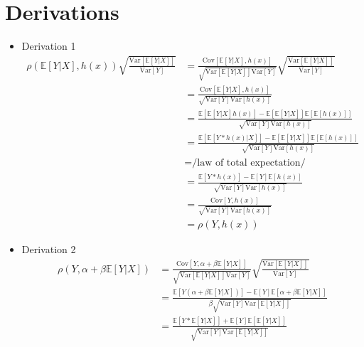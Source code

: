 \documentclass{article}
\begin{document}
\section*{Derivations}

\begin{itemize}
    \item Derivation 1
    \begin{align*}
        \rho(\mathbb{\text{E}}[Y|X], h(x))\sqrt{\frac{\text{Var}[\mathbb{\text{E}}[Y|X]]}{\text{Var}[Y]}} &= \frac{\text{Cov}[\mathbb{\text{E}}[Y|X], h(x)]}{\sqrt{\text{Var}[\mathbb{\text{E}}[Y|X]]\text{Var}[Y]}}\sqrt{\frac{\text{Var}[\mathbb{\text{E}}[Y|X]]}{\text{Var}[Y]}}\\
        &= \frac{\text{Cov}[\mathbb{\text{E}}[Y|X], h(x)]}{\sqrt{\text{Var}[Y]\text{Var}[h(x)]}} \\
        &= \frac{\mathbb{\text{E}}[\mathbb{\text{E}}[Y|X]h(x)] - \mathbb{\text{E}}[\mathbb{\text{E}}[Y|X]]\mathbb{\text{E}}[\mathbb{\text{E}}[h(x)]]}{\sqrt{\text{Var}[Y]\text{Var}[h(x)]}} \\
        &= \frac{\mathbb{\text{E}}[\mathbb{\text{E}}[Y*h(x)|X]] - \mathbb{\text{E}}[\mathbb{\text{E}}[Y|X]]\mathbb{\text{E}}[\mathbb{\text{E}}[h(x)]]}{\sqrt{\text{Var}[Y]\text{Var}[h(x)]}} \\
        &= \text{/law of total expectation/} \\
        &= \frac{\mathbb{\text{E}}[Y*h(x)] - \mathbb{\text{E}}[Y]\mathbb{\text{E}}[h(x)]}{\sqrt{\text{Var}[Y]\text{Var}[h(x)]}} \\
        &= \frac{\text{Cov}[Y, h(x)]}{\sqrt{\text{Var}[Y]\text{Var}[h(x)]}} \\
        &= \rho(Y, h(x))
    \end{align*}
    \item Derivation 2
    \begin{align*}
        \rho(Y, \alpha + \beta \mathbb{\text{E}}[Y|X]) &= \frac{\text{Cov}[Y, \alpha + \beta \mathbb{\text{E}}[Y|X]]}{\sqrt{\text{Var}[\mathbb{\text{E}}[Y|X]]\text{Var}[Y]}}\sqrt{\frac{\text{Var}[\mathbb{\text{E}}[Y|X]]}{\text{Var}[Y]}}\\
        &= \frac{\mathbb{\text{E}}[Y(\alpha + \beta \mathbb{\text{E}}[Y|X])] - \mathbb{\text{E}}[Y]\mathbb{\text{E}}[\alpha + \beta \mathbb{\text{E}}[Y|X]]}{\beta\sqrt{\text{Var}[Y]\text{Var}[\mathbb{\text{E}}[Y|X]]}}\\
        &= \frac{\mathbb{\text{E}}[Y * \mathbb{\text{E}}[Y|X]] + \mathbb{\text{E}}[Y]\mathbb{\text{E}}[\mathbb{\text{E}}[Y|X]]}{\sqrt{\text{Var}[Y]\text{Var}[\mathbb{\text{E}}[Y|X]]}}\\

\end{align*}
\end{itemize}
\end{document}
